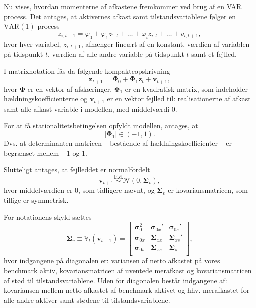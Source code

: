 \documentclass[
  a4paper,
  oneside]{memoir}
\begin{document}
\vspace{5mm}

Nu vises, hvordan momenterne af afkastene fremkommer ved brug af en VAR process. Det antages, at aktivernes afkast samt tilstandsvariablene følger en \(\text{VAR}(1)\) process
\begin{equation}
        z_{i,t+1}=\varphi_0+\varphi_1 z_{1,t}+\dots+\varphi_i z_{i,t}+\dots+v_{i,t+1},
    \end{equation}
hvor hver variabel, \(z_{i,t+1}\), afhænger lineært af en konstant, værdien af variablen på tidspunkt \(t\), værdien af alle andre variable på tidspunkt \(t\) samt et fejlled.

\vspace{5mm}

I matrixnotation fås da følgende kompakteopskrivning
\begin{equation}\label{eq:1}
        \bm{z}_{t+1}=\bm{\Phi}_0+\bm{\Phi}_1\bm{z}_t+\bm{v}_{t+1},
    \end{equation}
hvor \(\bm{\Phi}\) er en vektor af afskæringer, \(\bm{\Phi}_1\) er en kvadratisk matrix, som indeholder hældningskoefficienterne og \(\bm{v}_{t+1}\) er en vektor fejlled til: realisationerne af afkast samt alle afkast variable i modellen, med middelværdi \(0\).

\vspace{5mm}

For at få stationalitetsbetingelsen opfyldt modellen, antages, at
\begin{equation*}
        |\bm{\Phi}_1|\in(-1,1).
    \end{equation*}
Dvs. at determinanten matricen -- bestående af hældningskoefficienter -- er begrænset mellem \(-1\) og \(1\).

\vspace{5mm}

Slutteligt antages, at fejlleddet er normalfordelt
\begin{equation}\label{eq:2}
        \bm{v}_{t+1}\overset{\text{i.i.d.}}{\sim}\mathcal{N}(0,\bm{\Sigma}_v),
    \end{equation}
hvor middelværdien er \(0\), som tidligere nævnt, og \(\bm{\Sigma}_v\) er kovariansmatricen, som tillige er symmetrisk.

For notationens skyld sættes
\begin{equation*}
        \bm{\Sigma}_v\equiv \mathbb{V}_t(\bm{v}_{t+1})=
        \begin{bmatrix}
        \bm{\sigma}_0^2 & \bm{\sigma}_{0x}' & \bm{\sigma}_{0s}'\\
        \bm{\sigma}_{0x} & \bm{\Sigma}_{xx} & \bm{\Sigma}_{xs}'\\
        \bm{\sigma}_{0s} & \bm{\Sigma}_{xs} & \bm{\Sigma}_{s}\\
        \end{bmatrix},
    \end{equation*}
hvor indgangene på diagonalen er: variansen af netto afkastet på vores benchmark aktiv, kovariansmatricen af uventede merafkast og kovariansmatricen af stød til tilstandsvariablene. Uden for diagonalen består indgangene af: kovariansen mellem netto afkastet af benchmark aktivet og hhv. merafkastet for alle andre aktiver samt stødene til tilstandsvariablene.
\end{document}
